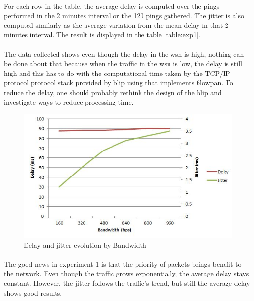 \documentclass[oneside,12pt,a4paper,final]{book}
\begin{document}
\paragraph{}
For each row in the table, the average delay is computed over the pings performed in the 2 minutes interval or the 120 pings gathered. The jitter is also computed similarly as the average variation from the mean delay in that 2 minutes interval. The result is displayed in the table \ref{table:exp1}. 
\paragraph{}
The data collected shows even though the delay in the \gls{wsn} is high, 
 nothing can be done about that because when the traffic in the \gls{wsn} is low, the delay is still high and this has to do with the computational time taken by the TCP/IP protocol protocol stack provided by \gls{blip} using that implements \gls{6lowpan}. To reduce the delay, one should probably rethink the design of the \gls{blip} and investigate ways to reduce processing time.
 
 \begin{figure}[htbp]
 \centering
 \includegraphics[scale=1]{img/delay_jitter.JPG}
 \caption{Delay and jitter evolution by Bandwidth}
 \label{fig:delay_jitter}
 \end{figure}
 
 \paragraph{}
 The good news in experiment 1 is that the priority of packets brings benefit to the network. Even though the traffic grows exponentially, the average delay stays constant. However, the jitter follows the traffic's trend, but still the average delay shows good results. 
 
\end{document}
